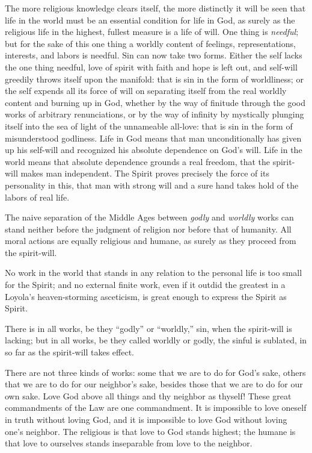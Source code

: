 \documentclass[12pt,a4paper,openany]{book}
\newcommand{\opage}[1]{\marginnote{\footnotesize\textit{[#1]}}}
\begin{document}
The more religious knowledge clears itself, the more
distinctly it will be seen that life in the world must be an
essential condition for life in God, as surely as the religious
life in the highest, fullest measure is a life of will. One thing is \emph{needful};
but for the sake of this one thing a worldly content
of feelings, representations, interests, and labors is needful.
Sin can now take two forms. Either the self lacks
the one thing needful, love of spirit with faith and hope
is left out, and self-will greedily throws itself upon the
manifold: that is sin in the form of worldliness;
or the self expends all its force of will on separating itself
from the real worldly content and burning up in God,
whether by the way of finitude through the good works of
arbitrary renunciations, or by the way of infinity by
mystically plunging itself into the sea of light of the unnameable all-love:
that is sin in the form of misunderstood godliness.
Life in God means that man unconditionally
\setcounter{footnote}{0}%
\opage{74}has given up his self-will and recognized his absolute dependence
on God's will. Life in the world means that
absolute dependence grounds a real freedom,
that the spirit-will makes man independent. The Spirit
proves precisely the force of its personality in this, that man
with strong will and a sure hand takes hold of the labors
of real life.

The naive separation of the Middle Ages between \emph{godly}
and \emph{worldly} works can stand neither before the judgment of religion
nor before that of humanity. All moral actions
are equally religious and humane, as surely as they
proceed from the spirit-will.

No work in the world that stands in any relation
to the personal life is too small for the Spirit; and no
external finite work, even if it outdid the greatest
in a Loyola's heaven-storming asceticism, is great enough
to express the Spirit as Spirit.

There is in all works, be they ``godly'' or
``worldly,'' sin, when the spirit-will is lacking; but in all
works, be they called worldly or godly, the sinful
is sublated, in so far as the spirit-will takes effect.

There are not three kinds of works: some that we are to
do for God's sake, others that we are to do for our neighbor's
sake, besides those that we are to do for our own sake.
Love God above all things and thy neighbor as thyself!
These great commandments of the Law are one commandment. It is
impossible to love oneself in truth without loving God,
and it is impossible to love God without loving one's neighbor.
The religious is that love to God stands highest; the
humane is that love to ourselves stands inseparable
from love to the neighbor.
\end{document}
